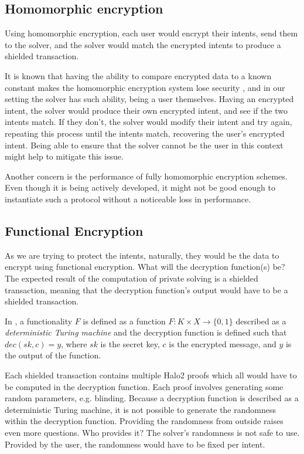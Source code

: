 \documentclass[
    9pt,            %
    report,        %
    affiltop,       %
]{art}
\begin{document}
\subsection{Homomorphic encryption}

Using homomorphic encryption, each user would encrypt their intents, send them to the solver, and the solver would match the encrypted intents to produce a shielded transaction.

\hfill

It is known that having the ability to compare encrypted data to a known constant makes the homomorphic encryption system lose security \cite{databanks}, and in our setting the solver has such ability, being a user themselves. Having an encrypted intent, the solver would produce their own encrypted intent, and see if the two intents match. If they don't, the solver would modify their intent and try again, repeating this process until the intents match, recovering the user's encrypted intent. Being able to ensure that the solver cannot be the user in this context might help to mitigate this issue.

\hfill

Another concern is the performance of fully homomorphic encryption schemes. Even though it is being actively developed, it might not be good enough to instantiate such a protocol without a noticeable loss in performance.

\subsection{Functional Encryption}

As we are trying to protect the intents, naturally, they would be the data to encrypt using functional encryption. What will the decryption function(s) be? The expected result of the computation of private solving is a shielded transaction, meaning that the decryption function's output would have to be a shielded transaction.

\hfill

In \cite{fe}, a functionality $F$ is defined as a function $F: K \times X \rightarrow \{0, 1\}$ described as a \textit{deterministic Turing machine} and the decryption function is defined such that $dec(sk, c) = y$, where $sk$ is the secret key, $c$ is the encrypted message, and $y$ is the output of the function.

Each shielded transaction contains multiple Halo2 proofs which all would have to be computed in the decryption function. Each proof involves generating some random parameters, e.g. blinding. Because a decryption function is described as a deterministic Turing machine, it is not possible to generate the randomness within the decryption function. Providing the randomness from outside raises even more questions. Who provides it? The solver's randomness is not safe to use. Provided by the user, the randomness would have to be fixed per intent.
\end{document}
